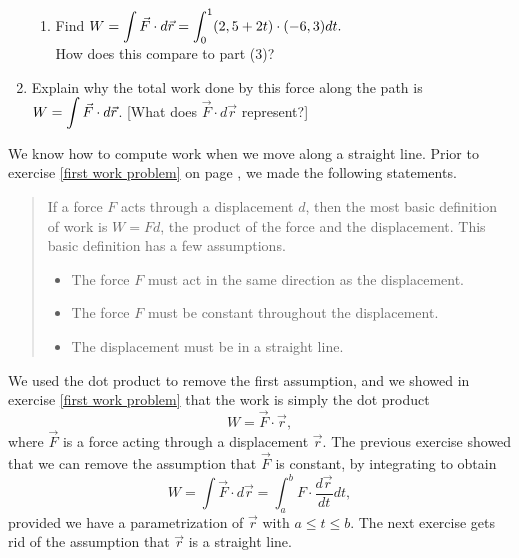 \begin{problem}
\begin{enumerate}
\begin{enumerate}[label=\roman*]
\item Find $\displaystyle W=\int \vec F\cdot d\vec r = \int_0^1 (2,5+2t)\cdot (-6,3)dt.$\\ How does this compare to part (3)?
\end{enumerate}
\item Explain why the total work done by this force along the path is \\ \indent $\displaystyle W=\int \vec F\cdot d\vec r$. [What does $\vec{F} \cdot d\vec{r}$ represent?] 
\end{enumerate}
\end{problem}

We know how to compute work when we move along a straight line. Prior to exercise \ref{first work problem} on page \pageref{first work problem}, we made the following statements. 
\begin{quote}If a force $F$ acts through a displacement $d$, then the most basic definition of work is $W=Fd$, the product of the force and the displacement.  This basic definition has a few assumptions.
\begin{itemize}
\item The force $F$ must act in the same direction as the displacement.
\item The force $F$ must be constant throughout the  displacement.
\item The displacement must be in a straight line.
\end{itemize}
\end{quote}
We used the dot product to remove the first assumption, and we showed in exercise \ref{first work problem} that the work is simply the dot product $$W=\vec F\cdot \vec r,$$
where $\vec F$ is a force acting through a displacement $\vec r$. The previous exercise showed that we can remove the assumption that $\vec F$ is constant, by integrating to obtain $$W=\int \vec F \cdot d\vec r = \int_a^b F\cdot \frac{d\vec r}{dt}dt, $$ provided we have a parametrization of $\vec r$ with $a\leq t\leq b$. The next exercise gets rid of the assumption that $\vec r$ is a straight line.  

